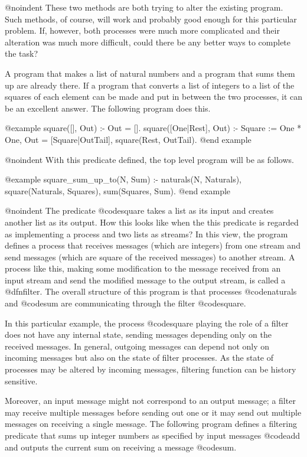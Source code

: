 {@noindent
These two methods are both trying to alter the existing program.  Such
methods, of course, will work and probably good enough for this
particular problem.  If, however, both processes were much more
complicated and their alteration was much more difficult, could there be
any better ways to complete the task?

A program that makes a list of natural numbers and a program that sums
them up are already there.  If a program that converts a list of
integers to a list of the squares of each element can be made and put
in between the two processes, it can be an excellent answer.  The
following program does this.

@example
square([], Out) :- Out = [].
square([One|Rest], Out) :-
    Square := One * One,
    Out = [Square|OutTail],
    square(Rest, OutTail).
@end example

@noindent
With this predicate defined, the top level program will be as follows.

@example
square_sum_up_to(N, Sum) :-
    naturals(N, Naturals),
    square(Naturals, Squares),
    sum(Squares, Sum).
@end example

@noindent
The predicate @code{square} takes a list as its input and creates
another list as its output.  How this looks like when the this predicate
is regarded as implementing a process and two lists as streams?  In this
view, the program defines a process that receives messages (which are
integers) from one stream and send messages (which are square of the
received messages) to another stream.  A process like this, making some
modification to the message received from an input stream and send the
modified message to the output stream, is called a @dfn{filter}.  The
overall structure of this program is that processes @code{naturals} and
@code{sum} are communicating through the filter @code{square}.

In this particular example, the process @code{square} playing the role
of a filter does not have any internal state, sending messages depending
only on the received messages.  In general, outgoing messages can depend
not only on incoming messages but also on the state of filter processes.
As the state of processes may be altered by incoming messages, filtering
function can be history sensitive.

Moreover, an input message might not correspond to an output message; a
filter may receive multiple messages before sending out one or it may
send out multiple messages on receiving a single message.  The following
program defines a filtering predicate that sums up integer numbers as
specified by input messages @code{add} and outputs the current sum on
receiving a message @code{sum}.

}
